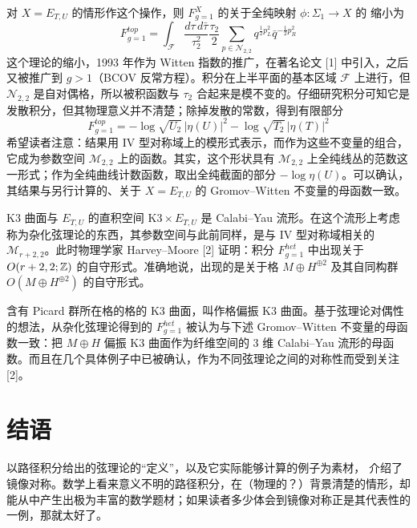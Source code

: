 对 $X=E_{T,U}$ 的情形作这个操作，则 $F_{g=1}^X$ 的关于全纯映射 $\phi\colon\Sigma_1\to X$ 的
缩小为
\[
  F_{g=1}^{top}=\int_{\mathcal{F}}\frac{d\tau\,d\bar\tau}{\tau_2^2}
  \frac{\tau_2}{2}\sum_{p\in\mathcal{N}_{2,2}}
  q^{\frac{1}{2}p_L^2}\bar q^{-\frac{1}{2}p_R^2}
\]
这个理论的缩小，1993 年作为 Witten 指数的推广，在著名论文 [1] 中引入，之后又被推广到 $g>1$（BCOV 反常方程）。积分在上半平面的基本区域 $\mathcal{F}$ 上进行，但 $\mathcal{N}_{2,2}$ 是自对偶格，所以被积函数与 $\tau_2$ 合起来是模不变的。仔细研究积分可知它是发散积分，但其物理意义并不清楚；除掉发散的常数，得到有限部分
\[
  F_{g=1}^{top}=-\log\sqrt{U_2}\,|\eta(U)|^2
  -\log\sqrt{T_2}\,|\eta(T)|^2
\]
希望读者注意：结果用 IV 型对称域上的模形式表示，而作为这些不变量的组合，它成为参数空间 $\mathcal{M}_{2,2}$ 上的函数。其实，这个形状具有 $\mathcal{M}_{2,2}$ 上全纯线丛的范数这一形式；作为全纯曲线计数函数，取出全纯截面的部分 $-\log\eta(U)$。可以确认，其结果与另行计算的、关于 $X=E_{T,U}$ 的 Gromov--Witten 不变量的母函数一致。

K3 曲面与 $E_{T,U}$ 的直积空间 $\mathrm{K3}\times E_{T,U}$ 是 Calabi--Yau 流形。在这个流形上考虑称为杂化弦理论的东西，其参数空间与此前同样，是与 IV 型对称域相关的 $\mathcal{M}_{r+2,2}$。此时物理学家 Harvey--Moore [2] 证明：积分 $F_{g=1}^{het}$ 中出现关于 $O(r+2,2;\mathbb{Z})$ 的自守形式。准确地说，出现的是关于格 $M\oplus H^{\oplus 2}$ 及其自同构群 $O(M\oplus H^{\oplus 2})$ 的自守形式。

含有 Picard 群所在格的格的 K3 曲面，叫作格偏振 K3 曲面。基于弦理论对偶性的想法，从杂化弦理论得到的 $F_{g=1}^{het}$ 被认为与下述 Gromov--Witten 不变量的母函数一致：把 $M\oplus H$ 偏振 K3 曲面作为纤维空间的 3 维 Calabi--Yau 流形的母函数。而且在几个具体例子中已被确认，作为不同弦理论之间的对称性而受到关注 [2]。

\section{结语}

以路径积分给出的弦理论的“定义”，以及它实际能够计算的例子为素材，
介绍了镜像对称。数学上看来意义不明的路径积分，在（物理的？）背景清楚的情形，却能从中产生出极为丰富的数学题材；如果读者多少体会到镜像对称正是其代表性的一例，那就太好了。

